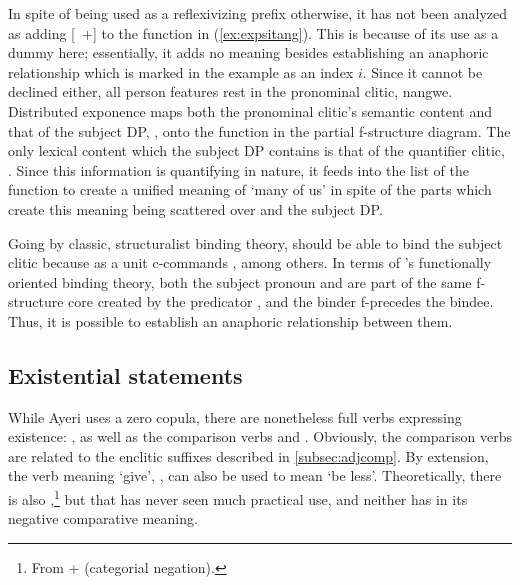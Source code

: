 In spite of  being used as a reflexivizing prefix
otherwise, it has not been analyzed as adding [\Refl{}~$+$] to the
\Subj{} function in (\ref{ex:expsitang}). This is because of its use as a dummy
here; essentially, it adds no meaning besides establishing an anaphoric
relationship which is marked in the example as an index $i$. Since it cannot be
declined either, all person features rest in the pronominal clitic, 
{nang}{we}. Distributed exponence maps both the pronominal clitic's semantic
content and that of the subject DP, , onto the
\Subj{} function in the partial f-structure diagram. The only lexical content
which the subject DP contains is that of the quantifier clitic,
. Since this information is quantifying in nature, it
feeds into the \Quant{} list of the \Subj{} function to create a unified
meaning of `many of us' in spite of the parts which create this meaning being
scattered over  and the subject DP.

Going by classic, structuralist binding theory,  should be
able to bind the subject clitic because  as a unit
c-commands , among others. In terms of \Lfg{}'s
functionally oriented binding theory, both the subject pronoun and
 are part of the same f-structure core created by
the predicator , and the binder f-precedes the
bindee. Thus, it is possible to establish an anaphoric relationship between
them.

\subsection{Existential statements}
\label{subsec:exs}

While Ayeri uses a zero copula, there are nonetheless full verbs expressing
existence: , as well as the
comparison verbs   and
. Obviously, the comparison verbs are related to the
enclitic suffixes described in \autoref{subsec:adjcomp}. By extension, the verb
meaning `give', , can also be used to mean `be less'.
Theoretically, there is also ,\footnote{From
 +  (categorial negation).} but that
has never seen much practical use, and neither has  in its
negative comparative meaning.

